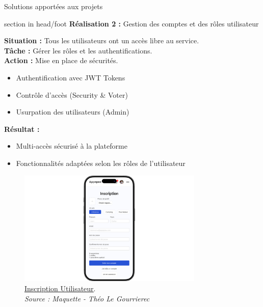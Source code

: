 \documentclass{beamer}
\begin{document}
\begin{frame}{Solutions apportées aux projets}
	\begin{beamercolorbox}[wd=\paperwidth,ht=1.5em,dp=0.5em,leftskip=0.5cm]{section in head/foot}
  		\large \textbf{Réalisation 2 :} \normalsize Gestion des comptes et des rôles utilisateur
	\end{beamercolorbox}
	\vspace{0.5em}
	\begin{center}
		 {
  			\begin{minipage}{0.9\textwidth}
  				\textbf{Situation :} Tous les utilisateurs ont un accès libre au service.\pause \\
  				\textbf{Tâche :} Gérer les rôles et les authentifications.\pause \\
  				\textbf{Action :} Mise en place de sécurités.
  				\begin{itemize}
  					\item Authentification avec JWT Tokens
  					\item Contrôle d'accès (Security \& Voter)
  					\item Usurpation des utilisateurs (Admin)
  					\end{itemize}
  				\pause

				\textbf{Résultat :}
				\begin{itemize}
					\item Multi-accès sécurisé à la plateforme
					\item Fonctionnalités adaptées selon les rôles de l'utilisateur
				\end{itemize}
	  		\end{minipage}
  		}
  		
  		\only<5> {
			\begin{figure}[t]
  				\includegraphics[height=5.5cm]{../img/maquette/inscription.png}
				\caption{	
					\centering			
  					\href{https://github.com/Matteo-K/Soutenance_E-delic/blob/main/img/maquette/inscription.png}{\underline{Inscription Utilisateur}}.\\
  					\textit{Source : Maquette - Théo Le Gourrierec}
				}
  				\label{fig:inscription}
  			\end{figure}
		}
		

\end{center}
\end{frame}
\end{document}
